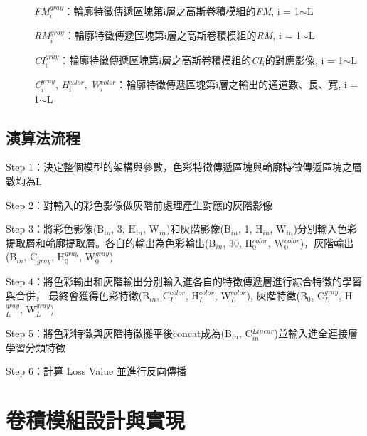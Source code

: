 \documentclass[class=NCU_thesis, crop=false]{standalone}
\begin{document}
\begin{description}
		\item[]\textit{FM}$^{gray}_{i}$：輪廓特徵傳遞區塊第i層之高斯卷積模組的\textit{FM}, i = 1$\sim$L
		\item[]\textit{RM}$^{gray}_{i}$：輪廓特徵傳遞區塊第i層之高斯卷積模組的\textit{RM}, i = 1$\sim$L
		\item[]\textit{CI}$^{gray}_{i}$：輪廓特徵傳遞區塊第i層之高斯卷積模組的\textit{CI}$_{i}$的對應影像, i = 1$\sim$L
		\item[]\textit{C}$^{gray}_{i}$, \textit{H}$^{color}_{i}$, \textit{W}$^{color}_{i}$：輪廓特徵傳遞區塊第i層之輸出的通道數、長、寬, i = 1$\sim$L
	\end{description}

\subsection{演算法流程}
Step 1：決定整個模型的架構與參數，色彩特徵傳遞區塊與輪廓特徵傳遞區塊之層數均為L

Step 2：對輸入的彩色影像做灰階前處理產生對應的灰階影像

Step 3：將彩色影像(B$_{in}$, 3, H$_{in}$, W$_{in}$)和灰階影像(B$_{in}$, 1, H$_{in}$, W$_{in}$)分別輸入色彩提取層和輪廓提取層。各自的輸出為色彩輸出(B$_{in}$, 30, H$^{color}_{0}$, W$^{color}_{0}$)，灰階輸出(B$_{in}$, C${_{gray}}$, H$^{gray}_{0}$, W$^{gray}_{0}$)

Step 4：將色彩輸出和灰階輸出分別輸入進各自的特徵傳遞層進行綜合特徵的學習與合併，
		最終會獲得色彩特徵(B$_{in}$, C$^{color}_{L}$, H$^{color}_{L}$, W$^{color}_{L}$), 灰階特徵(B$_{0}$, C$^{gray}_{L}$, H$^{gray}_{L}$, W$^{gray}_{L}$)

Step 5：將色彩特徵與灰階特徵攤平後concat成為(B$_{in}$, C$^{Linear}_{in}$)並輸入進全連接層學習分類特徵

Step 6：計算 Loss Value 並進行反向傳播


\pagebreak

\section{卷積模組設計與實現}
\end{document}
